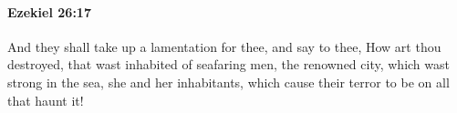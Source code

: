 
		\paragraph{Ezekiel 26:17} %
			\label{EZEKIEL-26-17}

			And they shall take up a lamentation for thee, and say to thee, How art thou destroyed, that wast inhabited of seafaring men, the renowned city, which wast strong in the sea, she and her inhabitants, which cause their terror to be on all that haunt it!


